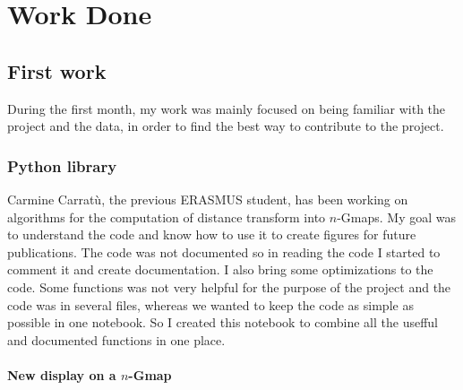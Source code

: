 \chapter{Work Done}
 
\section{First work}

During the first month, my work was mainly focused on being familiar with the
project and the data, in order to find the best way to contribute to the project.

\subsection{Python library}

Carmine Carratù, the previous ERASMUS student, has been working on algorithms for the
computation of distance transform into $n$-Gmaps. My goal was to understand the code
and know how to use it to create figures for future publications. The code was not
documented so in reading the code I started to comment it and create documentation.
I also bring some optimizations to the code. Some functions was not very helpful for
the purpose of the project and the code was in several files, whereas we wanted to
keep the code as simple as possible in one notebook. So I created this notebook to
combine all the usefful and documented functions in one place.

\subsubsection{New display on a $n$-Gmap}

